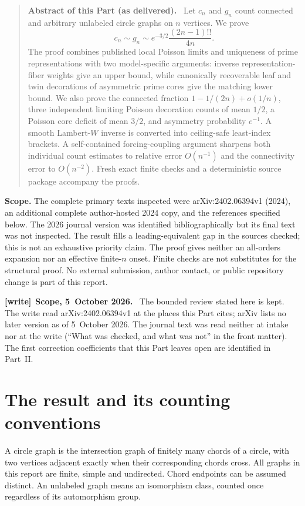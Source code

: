 \documentclass[11pt,letterpaper]{article}
\numberwithin{equation}{section}
\theoremstyle{definition}\newtheorem{definition}[theorem]{Definition}
\theoremstyle{remark}\newtheorem{remark}[theorem]{Remark}
\newenvironment{writenote}[1][]{\par\smallskip\begingroup\small
 \noindent\textbf{[write]}\if\relax\detokenize{#1}\relax\else~\textbf{#1.}\fi\ }%
 {\par\endgroup\smallskip}
\newenvironment{partabstract}{\begin{quote}\small\noindent\textbf{Abstract of this Part (as delivered).}\ }{\end{quote}}
\begin{document}
\begin{partabstract}
Let $c_n$ and $g_n$ count connected and arbitrary unlabeled circle
graphs on $n$ vertices. We prove
\[
 c_n\sim g_n\sim e^{-3/2}\frac{(2n-1)!!}{4n}.
\]
The proof combines published local Poisson limits and uniqueness of
prime representations with two model-specific arguments: inverse
representation-fiber weights give an upper bound, while canonically
recoverable leaf and twin decorations of asymmetric prime cores give
the matching lower bound. We also prove the connected fraction
$1-1/(2n)+o(1/n)$, three independent limiting Poisson decoration
counts of mean $1/2$, a Poisson core deficit of mean $3/2$, and
asymmetry probability $e^{-1}$. A smooth Lambert-$W$ inverse is
converted into ceiling-safe least-index brackets. A self-contained forcing-coupling argument sharpens both individual
count estimates to relative error $O(n^{-1})$ and the connectivity
error to $O(n^{-2})$. Fresh exact finite checks and a deterministic
source package accompany the proofs.
\end{partabstract}
\noindent\textbf{Scope.} The complete primary texts inspected were
arXiv:2402.06394v1 (2024), an additional complete author-hosted 2024
copy, and the references specified below. The 2026 journal version
was identified bibliographically but its final text was not inspected.
The result fills a leading-equivalent gap in the sources checked;
this is not an exhaustive priority claim. The proof gives neither an
all-orders expansion nor an effective finite-$n$ onset. Finite checks
are not substitutes for the structural proof. No external submission,
author contact, or public repository change is part of this report.
\begin{writenote}[Scope, 5~October 2026]
The bounded review stated here is kept. The write read arXiv:2402.06394v1 at the places this Part cites; arXiv lists no later version as of 5~October 2026. The journal text was read neither at intake nor at the write (``What was checked, and what was not'' in the front matter). The first correction coefficients that this Part leaves open are identified in Part~II.
\end{writenote}

\section{The result and its counting conventions}\label{cgr:ld:sec:result}
A circle graph is the intersection graph of finitely many chords of a
circle, with two vertices adjacent exactly when their corresponding
chords cross. All graphs in this report are finite, simple and
undirected. Chord endpoints can be assumed distinct. An unlabeled
graph means an isomorphism class, counted once regardless of its
automorphism group.
\end{document}
